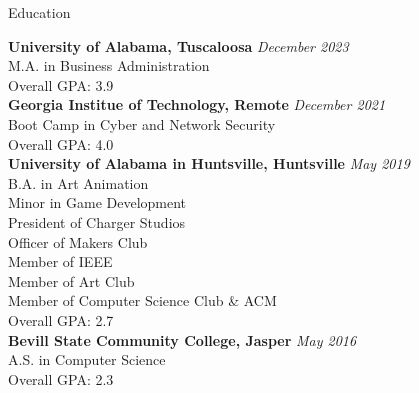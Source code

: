 \documentclass[
	11pt, %
]{crumpcv} %
\begin{document}

\begin{rSection}{Education}
	
	\textbf{University of Alabama, Tuscaloosa} \hfill \textit{December 2023} \\ 
	M.A. in Business Administration \\
	Overall GPA: 3.9 \\

	\textbf{Georgia Institue of Technology, Remote} \hfill \textit{December 2021} \\
	Boot Camp in Cyber and Network Security \\
	Overall GPA: 4.0 \\

	\textbf{University of Alabama in Huntsville, Huntsville} \hfill \textit{May 2019} \\ 
	B.A. in Art Animation \\
	Minor in Game Development \smallskip \\
	President of Charger Studios \\
	Officer of Makers Club \\
	Member of IEEE \\
	Member of Art Club \\
	Member of Computer Science Club \& ACM \\
	Overall GPA: 2.7 \\

	\textbf{Bevill State Community College, Jasper} \hfill \textit{May 2016} \\
	A.S. in Computer Science \\	
	Overall GPA: 2.3 \\
	
\end{rSection}

\end{document}
